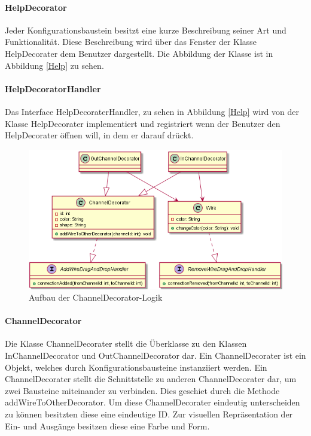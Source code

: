 \documentclass[parskip=full]{scrartcl}
\begin{document}
\paragraph{HelpDecorator}

Jeder Konfigurationsbaustein besitzt eine kurze Beschreibung seiner Art und Funktionalität. Diese Beschreibung wird über das Fenster der Klasse HelpDecorater dem Benutzer dargestellt. Die Abbildung der Klasse ist in Abbildung \ref{Help} zu sehen.

\paragraph{HelpDecoratorHandler}

Das Interface HelpDecoraterHandler, zu sehen in Abbildung \ref{Help} wird von der Klasse HelpDecorater implementiert und registriert wenn der Benutzer den HelpDecorater öffnen will, in dem er darauf drückt.

\begin{figure}[htbp]
	\begin{center}
		\includegraphics[width = 13cm]{Grafiken/View/ChannelDecorator.png}
		\caption{Aufbau der ChannelDecorator-Logik}
		\label{ChannelDecorator}
	\end{center}
\end{figure}

\paragraph{ChannelDecorator}

Die Klasse ChannelDecorater stellt die Überklasse zu den Klassen InChannelDecorator und OutChannelDecorator dar. 
Ein ChannelDecorater ist ein Objekt, welches durch Konfigurationsbausteine instanziiert werden. Ein ChannelDecorater stellt die Schnittstelle zu anderen ChannelDecorater dar, um zwei Bausteine miteinander zu verbinden. Dies geschiet durch die Methode addWireToOtherDecorator. Um diese ChannelDecorater eindeutig unterscheiden zu können besitzten diese eine eindeutige ID. Zur visuellen Repräsentation der Ein- und Ausgänge besitzen diese eine Farbe und Form.
\end{document}
